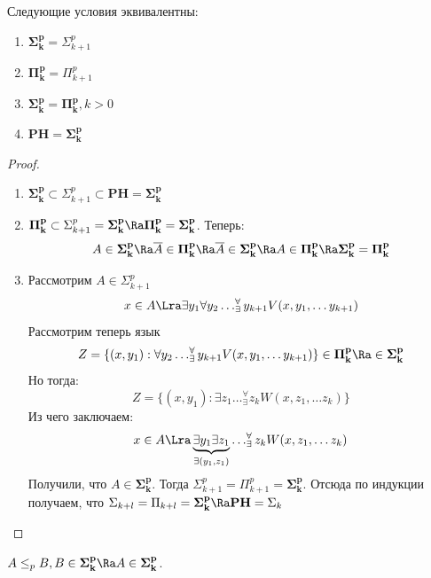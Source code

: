 \begin{theorem}
    Следующие условия эквивалентны:
    \begin{enumerate}
        \item \(\mathbf{\Sigma_k^p} = \Sigma_{k + 1}^p\)
        \item[1'.] \(\mathbf{\Pi_k^p} = \Pi_{k + 1}^p\)
        \item \(\mathbf{\Sigma_k^p} = \mathbf{\Pi_k^p}, k > 0\)
        \item \(\mathbf{PH} = \mathbf{\Sigma_k^p}\)
    \end{enumerate}
\end{theorem}
\begin{proof}\indent
    \begin{enumerate}
        \item[\((3) \Ra (1)\)] \(\mathbf{\Sigma_k^p} \subset \Sigma_{k + 1}^p \subset \mathbf{PH} = \mathbf{\Sigma_k^p}\)
        \item[\((1) \Ra (2)\)] \(\mathbf{\Pi_k^p} \subset \Sigma_{k + 1}^p = \mathbf{\Sigma_k^p} \Ra \mathbf{\Pi_k^p} = \mathbf{\Sigma_k^p}\). Теперь:
        \[A \in \mathbf{\Sigma_k^p} \Ra \overline{A} \in \mathbf{\Pi_k^p} \Ra \overline{A} \in \mathbf{\Sigma_k^p} \Ra A \in \mathbf{\Pi_k^p} \Ra \mathbf{\Sigma_k^p} = \mathbf{\Pi_k^p}\]
        \item[\((2) \Ra (3)\)] Рассмотрим \(A \in \Sigma_{k + 1}^p\)
        \[x \in A \Lra \exists y_1 \forall y_2 \dots_\exists^\forall y_{k + 1} V(x, y_1, \dots y_{k + 1})\]
        Рассмотрим теперь язык 
        \[Z = \{(x, y_1): \forall y_2 \dots_\exists^\forall y_{k + 1} V(x, y_1, \dots y_{k + 1})\} \in \mathbf{\Pi_k^p} \Ra \in \mathbf{\Sigma_k^p}\]
        Но тогда:
        \[Z = \{(x, y_1): \exists z_1 \dots_\exists^\forall z_k W(x, z_1, \dots z_k)\}\]
        Из чего заключаем:
        \[x \in A \Lra \underbrace{\exists y_1\exists z_1}_{\exists (y_1, z_1)}\dots_\exists^\forall z_k W(x, z_1, \dots z_k)\]
        Получили, что \(A \in \mathbf{\Sigma_k^p}\).
        Тогда \(\Sigma_{k + 1}^p = \Pi_{k + 1}^p = \mathbf{\Sigma_k^p}\). Отсюда по индукции получаем, что \(\Sigma_{k + l} = \Pi_{k + l} = \mathbf{\Sigma_k^p} \Ra \mathbf{PH} = \Sigma_k\)
    \end{enumerate}
\end{proof}

\begin{note}
    \(A \le_p B, B \in \mathbf{\Sigma_k^p} \Ra A \in \mathbf{\Sigma_k^p}\).
\end{note}

